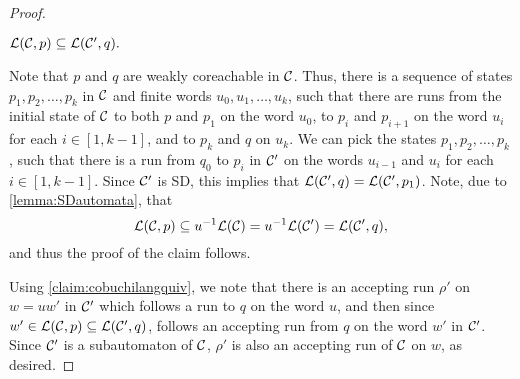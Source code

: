 \begin{proof}
    
    \begin{claim}\label{claim:cobuchilangquiv}
        $\mathcal{L}(\mathcal{C},p) \subseteq \mathcal{L}(\mathcal{C}',q).$
    \end{claim}
            Note that $p$ and $q$ are weakly coreachable in $\mathcal{C}$. Thus, there is a sequence of states $p_1,p_2,\dots,p_k$ in $\mathcal{C}$ and finite words $u_0, u_1,\dots,u_k$, such that there are runs from the initial state of $\mathcal{C}$ to both $p$ and $p_1$ on the word $u_0$, to $p_i$ and $p_{i+1}$ on the word $u_i$ for each $i \in [1,k-1]$, and to $p_k$ and $q$ on $u_k$. We can pick the states $p_1,p_2,\dots,p_k$, such that there is a run from $q_0$ to $p_i$ in $\mathcal{C}'$ on the words $u_{i-1}$ and $u_{i}$ for each $i \in [1,k-1]$. Since $\mathcal{C}'$ is SD, this implies that $\mathcal{L}(\mathcal{C}',q)=\mathcal{L}(\mathcal{C}',p_1)$. Note, due to \cref{lemma:SDautomata}, that $$\mathcal{L}(\mathcal{C},p) \subseteq u^{-1}\mathcal{L}(\mathcal{C})=u^{-1}\mathcal{L}(\mathcal{C}')= \mathcal{L}(\mathcal{C}',q),$$  and thus the proof of the claim follows.
   
Using \cref{claim:cobuchilangquiv}, we note that there is an accepting run $\rho'$ on $w=uw'$ in $\mathcal{C}'$ which follows a run to $q$ on the word $u$, and then since $w' \in \mathcal{L}(\mathcal{C},p) \subseteq \mathcal{L}(\mathcal{C}',q)$, follows an accepting run from $q$ on the word $w'$ in $\mathcal{C}'$. Since $\mathcal{C}'$ is a subautomaton of $\mathcal{C}$, $\rho'$ is also an accepting run of $\mathcal{C}$ on $w$, as desired.
\end{proof}

